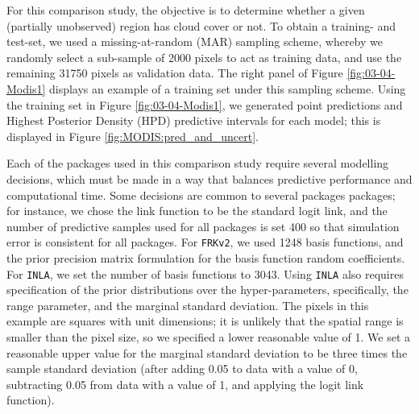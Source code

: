 For this comparison study, the objective is to determine whether a given (partially unobserved) region has cloud cover or not.
To obtain a training- and test-set, we used a missing-at-random (MAR) sampling scheme, whereby we randomly select a sub-sample of 2000 pixels to act as training data, and use the remaining 31750 pixels as validation data.
The right panel of Figure \ref{fig:03-04-Modis1} displays an example of a training set under this sampling scheme. 
Using the training set in Figure \ref{fig:03-04-Modis1}, we generated point predictions and Highest Posterior Density (HPD) predictive intervals for each model; this is displayed in Figure \ref{fig:MODIS:pred_and_uncert}.



Each of the packages used in this comparison study require several modelling decisions, which must be made in a way that balances predictive performance and computational time. 
Some decisions are common to several packages packages; for instance, we chose the link function to be the standard logit link, and the number of predictive samples used for all packages is set 400 so that simulation error is consistent for all packages.
For \texttt{FRKv2}, we used 1248 basis functions, and the prior precision matrix formulation for the basis function random coefficients.
For \texttt{INLA}, we set the number of basis functions to 3043.
Using \texttt{INLA} also requires specification of the prior distributions over the hyper-parameters, specifically, the range parameter, and the marginal standard deviation. 
The pixels in this example are squares with unit dimensions; it is unlikely that the spatial range is smaller than the pixel size, so we specified a lower reasonable value of 1. 
We set a reasonable upper value for the marginal standard deviation to be three times the sample standard deviation (after adding 0.05 to data with a value of 0, subtracting 0.05 from data with a value of 1, and applying the logit link function). 
